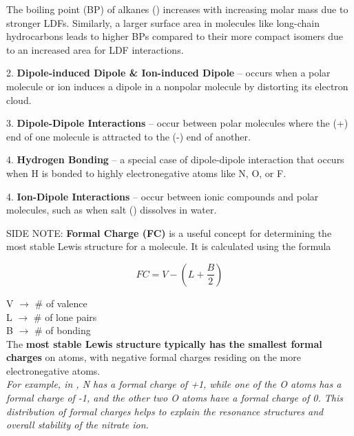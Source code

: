 \documentclass[10pt]{article}
\begin{document}

  \begin{definition}
    The boiling point (BP) of alkanes () increases with increasing molar mass due to stronger LDFs. Similarly, a larger surface area in molecules like long-chain hydrocarbons leads to higher BPs compared to their more compact isomers due to an increased area for LDF interactions.

  \end{definition}

  2. \textbf{Dipole-induced Dipole \& Ion-induced Dipole} -- occurs when a polar molecule or ion induces a dipole in a nonpolar molecule by distorting its electron cloud.


  3. \textbf{Dipole-Dipole Interactions} -- occur between polar molecules where the (+) end of one molecule is attracted to the (-) end of another.


  4. \textbf{Hydrogen Bonding} -- a special case of dipole-dipole interaction that occurs when H is bonded to highly electronegative atoms like N, O, or F.


  4. \textbf{Ion-Dipole Interactions} -- occur between ionic compounds and polar molecules, such as when salt () dissolves in water.


  \begin{definition}
  SIDE NOTE: \textbf{Formal Charge (FC)} is a useful concept for determining the most stable Lewis structure for a molecule. It is calculated using the formula

  \[
  FC = V - (L + \frac{B}{2})
  \]

  V $\rightarrow$ \# of valence  \\
  L $\rightarrow$ \# of lone pairs \\
  B $\rightarrow$ \# of bonding  \\
  
  The \textbf{most stable Lewis structure typically has the smallest formal charges} on atoms, with negative formal charges residing on the more electronegative atoms. \\
  
  \textit{For example, in , N has a formal charge of +1, while one of the O atoms has a formal charge of -1, and the other two O atoms have a formal charge of 0. This distribution of formal charges helps to explain the resonance structures and overall stability of the nitrate ion.}
  \end{definition}
\end{document}
